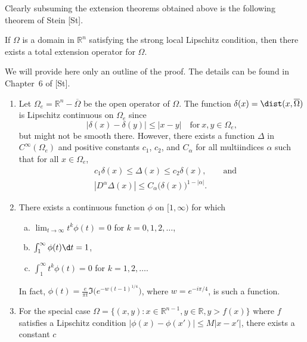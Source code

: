Clearly subsuming the extension theorems obtained above is the following
theorem of Stein [St].

\begin{theorem}
  If $\Omega$ is a domain in $\mathbb{R}^n$ satisfying the strong
  local Lipschitz condition, then there exists a total extension operator
  for $\Omega$.
\end{theorem}

We will provide here only an outline of the proof. The details can be found
in Chapter~6 of [St].

\begin{para}
  \begin{enumerate}
    \item Let $\Omega_e = \mathbb{R}^n - \overline{\Omega}$ be the open
      operator of $\Omega$. The function $\delta(x) = \dist(x, \overline{\Omega})$
      is Lipschitz continuous on $\Omega_e$ since
      \[ |\delta(x) - \delta(y)| \leq |x-y| \quad \text{for} \ x,y\in\Omega_e, \]
      but might not be smooth there. However, there exists a function
      $\Delta$ in $C^{\infty}(\Omega_e)$ and positive constants $c_1$, $c_2$,
      and $C_{\alpha}$ for all multiindices $\alpha$ such that for all $x\in\Omega_e$,
      \begin{align*}
        & c_1 \delta(x) \leq \Delta(x) \leq c_2 \delta(x), \qquad \text{and} \\
        & |D^{\alpha} \Delta(x)| \leq C_{\alpha} \bigl(\delta(x)\bigr)^{1-|\alpha|}.
      \end{align*}
    \item There exists a continuous function $\phi$ on $[1,\infty)$ for which
      \begin{enumerate}[(a)]
        \item $\lim_{t\to\infty} t^k \phi(t) = 0$ for $k=0,1,2,\ldots$,
        \item $\int_1^{\infty} \phi(t) \d t = 1$,
        \item $\int_1^{\infty} t^k \phi(t) = 0$ for $k=1,2,\ldots$.
      \end{enumerate}
      In fact, $\phi(t) = \frac{e}{\pi t} \Im\bigl(e^{-w(t-1)^{1/4}}\bigr)$,
      where $w = e^{-i\pi/4}$, is such a function.
    \item For the special case $\Omega = \{(x,y) : x\in\mathbb{R}^{n-1}, y\in\mathbb{R},
      y > f(x)\}$ where $f$ satisfies a Lipschitz condition
      $|\phi(x) - \phi(x')|\leq M|x-x'|$, there exists a constant $c$

\end{enumerate}
\end{para}
